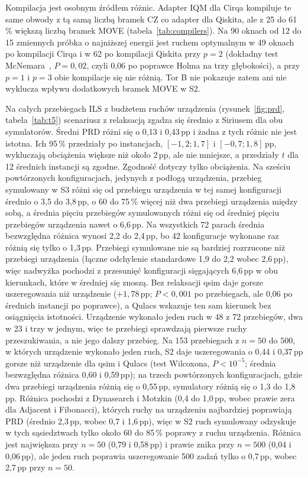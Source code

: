 \documentclass{scspaperproc}
\begin{document}
Kompilacja jest osobnym źródłem różnic. Adapter IQM dla Cirqa kompiluje te
same obwody z tą samą liczbą bramek CZ co adapter dla Qiskita, ale z 25 do
61\,\% większą liczbą bramek MOVE (tabela~\ref{tab:compilers}). Na 90 oknach od
12 do 15 zmiennych próbka o najniższej energii jest ruchem optymalnym
w 49 oknach po kompilacji Cirqa i w 62 po kompilacji Qiskita przy $p = 2$
(dokładny test McNemara~\cite{mcnemar1947}, $P = 0{,}02$, czyli 0,06 po
poprawce Holma na trzy głębokości), a przy $p = 1$ i $p = 3$ obie kompilacje
się nie różnią. Tor B nie pokazuje zatem ani nie wyklucza wpływu
dodatkowych bramek MOVE w S2.

Na całych przebiegach ILS z budżetem ruchów urządzenia
(rysunek~\ref{fig:prd}, tabela~\ref{tab:t5}) scenariusz z relaksacją zgadza się
średnio z Siriusem dla obu symulatorów. Średni PRD różni się o 0,13 i 0,43\,pp
i żadna z tych różnic nie jest istotna. Ich 95\,\% przedziały po instancjach,
$[-1{,}2; 1{,}7]$ i $[-0{,}7; 1{,}8]$\,pp, wykluczają obciążenia większe niż
około 2\,pp, ale nie mniejsze, a przedziały $t$ dla 12 średnich instancji są
zgodne. Zgodność dotyczy tylko obciążenia. Na sześciu powtórzonych
konfiguracjach, jedynych z podłogą urządzenia, przebieg symulowany w S3
różni się od przebiegu urządzenia w tej samej konfiguracji średnio o 3,5 do
3,8\,pp, o 60 do 75\,\% więcej niż dwa przebiegi urządzenia między sobą,
a średnia pięciu przebiegów symulowanych różni się od średniej pięciu
przebiegów urządzenia nawet o 6,6\,pp. Na wszystkich 72 parach średnia
bezwzględna różnica wynosi 2,2 do 2,4\,pp, bo 42 konfiguracje wykonane raz
różnią się tylko o 1,3\,pp. Przebiegi symulowane nie są bardziej rozrzucone
niż przebiegi urządzenia (łączne odchylenie standardowe 1,9 do 2,2 wobec
2,6\,pp), więc nadwyżka pochodzi z przesunięć konfiguracji sięgających 6,6\,pp
w obu kierunkach, które w średniej się znoszą. Bez relaksacji qsim daje
gorsze uszeregowania niż urządzenie ($+1{,}78$\,pp; $P < 0{,}001$ po
przebiegach, ale 0,06 po średnich instancji po poprawce), a Qulacs wskazuje
ten sam kierunek bez osiągnięcia istotności. Urządzenie wykonało jeden ruch
w 48 z 72 przebiegów, dwa w 23 i trzy w jednym, więc te przebiegi sprawdzają
pierwsze ruchy przeszukiwania, a nie jego dalszy przebieg. Na 153 przebiegach
z $n = 50$ do $500$, w których urządzenie wykonało jeden ruch, S2 daje
uszeregowania o 0,44 i 0,37\,pp gorsze niż urządzenie dla qsim i Qulacs (test
Wilcoxona, $P < 10^{-5}$; średnia bezwzględna różnica 0,60 i 0,59\,pp); na
trzech powtórzonych konfiguracjach, gdzie dwa przebiegi urządzenia różnią się
o 0,55\,pp, symulatory różnią się o 1,3 do 1,8\,pp. Różnica pochodzi
z Dynasearch i Motzkin (0,4 do 1,0\,pp, wobec prawie zera dla Adjacent
i Fibonacci), których ruchy na urządzeniu najbardziej poprawiają PRD (średnio
2,3\,pp, wobec 0,7 i 1,6\,pp), więc w S2 ruch symulowany odzyskuje w tych
sąsiedztwach tylko około 60 do 85\,\% poprawy z ruchu urządzenia. Różnica jest
największa przy $n = 50$ (0,79 i 0,58\,pp) i prawie znika przy $n = 500$ (0,04
i 0,06\,pp), ale jeden ruch poprawia uszeregowanie 500 zadań tylko o 0,7\,pp,
wobec 2,7\,pp przy $n = 50$.
\end{document}

